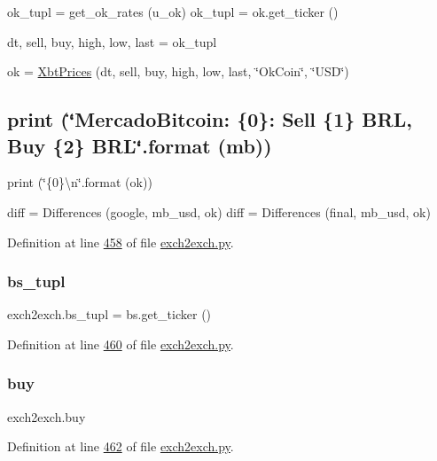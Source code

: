 ok\+\_\+tupl = get\+\_\+ok\+\_\+rates (u\+\_\+ok) ok\+\_\+tupl = ok.\+get\+\_\+ticker () 

dt, sell, buy, high, low, last = ok\+\_\+tupl

ok = \hyperlink{classexch2exch_1_1_xbt_prices}{Xbt\+Prices} (dt, sell, buy, high, low, last, \char`\"{}\+Ok\+Coin\char`\"{}, \char`\"{}\+U\+S\+D\char`\"{})

\subsection*{print (\char`\"{}\+Mercado\+Bitcoin\+: \{0\}\+: Sell \{1\} B\+R\+L, Buy \{2\} B\+R\+L\char`\"{}.format (mb))}

print (\char`\"{}\{0\}\textbackslash{}n\char`\"{}.format (ok))

\begin{DoxyVerb}diff = Differences (google, mb_usd, ok)
diff = Differences (final, mb_usd, ok) \end{DoxyVerb}
 

Definition at line \hyperlink{exch2exch_8py_source_l00458}{458} of file \hyperlink{exch2exch_8py_source}{exch2exch.\+py}.

\mbox{\label{namespaceexch2exch_a6e4164ccd0ea412356d0b9e4bbe35847}} 
\subsubsection{\texorpdfstring{bs\+\_\+tupl}{bs\_tupl}}
{\footnotesize\ttfamily exch2exch.\+bs\+\_\+tupl = bs.\+get\+\_\+ticker ()}



Definition at line \hyperlink{exch2exch_8py_source_l00460}{460} of file \hyperlink{exch2exch_8py_source}{exch2exch.\+py}.

\mbox{\label{namespaceexch2exch_ab7eb5c06d25fed3d99f5817c49fc2b30}} 
\subsubsection{\texorpdfstring{buy}{buy}}
{\footnotesize\ttfamily exch2exch.\+buy}



Definition at line \hyperlink{exch2exch_8py_source_l00462}{462} of file \hyperlink{exch2exch_8py_source}{exch2exch.\+py}.

